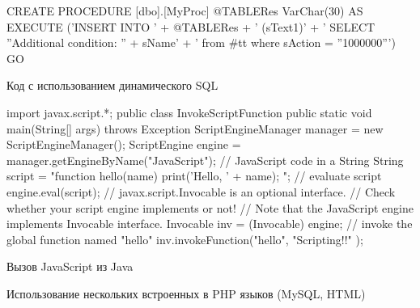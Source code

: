 \begin{listing}
    \begin{pyglist}[language=sql,numbers=left,numbersep=5pt]

CREATE PROCEDURE [dbo].[MyProc]  @TABLERes   VarChar(30)
AS
    EXECUTE ('INSERT INTO ' + @TABLERes + ' (sText1)' +
    ' SELECT ''Additional condition: '' + sName' +
    ' from #tt where sAction = ''1000000''')
GO
    \end{pyglist}
\caption{Код с использованием динамического SQL}
\label{lst:dsql1}
\end{listing} 
 
\begin{listing}
    \begin{pyglist}[language=java,numbers=left,numbersep=5pt]
import javax.script.*;  
public class InvokeScriptFunction {  
    public static void main(String[] args) throws Exception {  
        ScriptEngineManager manager = new ScriptEngineManager();  
        ScriptEngine engine = manager.getEngineByName("JavaScript");  
        // JavaScript code in a String  
        String script = 
            "function hello(name) { print('Hello, ' + name); }";  
        // evaluate script  
        engine.eval(script);  
        // javax.script.Invocable is an optional interface.  
        // Check whether your script engine implements or not!  
        // Note that the JavaScript engine implements Invocable interface.  
        Invocable inv = (Invocable) engine;  
        // invoke the global function named "hello"  
        inv.invokeFunction("hello", "Scripting!!" );  
    }  
}
    \end{pyglist}
\caption{Вызов JavaScript из Java}
\label{lst:JSformJava}
\end{listing}


\begin{listing}
\caption{Использование нескольких встроенных в PHP языков (MySQL, HTML)}
\label{lst:phpSqlHtml}
\end{listing}



